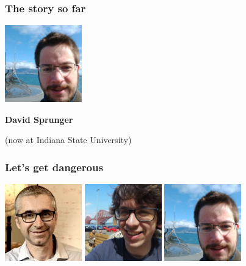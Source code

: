 \begin{frame}
    \frametitle{The story so far}

    \centering

    \includegraphics[width=0.25\textwidth]{imgs/sprunger}

    \LARGE
    \textbf{David Sprunger}

    \pause
    \normalsize
    (now at Indiana State University)

\end{frame}

\begin{frame}
    \frametitle{Let's get dangerous}

    \centering

    \includegraphics[width=0.25\textwidth]{imgs/ghica}
    \includegraphics[width=0.25\textwidth]{imgs/kaye}
    \includegraphics[width=0.25\textwidth]{imgs/sprunger}

\end{frame}